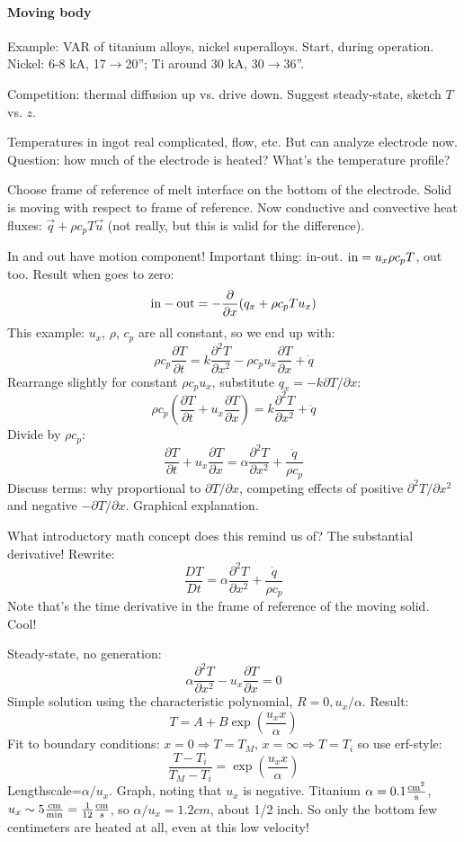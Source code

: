\documentclass{report}
\begin{document}
\paragraph{Moving body}
Example: VAR of titanium alloys, nickel superalloys.  Start, during operation.
Nickel: 6-8 kA, 17$\rightarrow$20''; Ti around 30 kA, 30$\rightarrow$36''.

Competition: thermal diffusion up vs. drive down.  Suggest steady-state, sketch
$T$ vs. $z$.

Temperatures in ingot real complicated, flow, etc.  But can analyze electrode
now.  Question: how much of the electrode is heated?  What's the temperature
profile?

Choose frame of reference of melt interface on the bottom of the electrode.
Solid is moving with respect to frame of reference.  Now conductive and
convective heat fluxes: $\vec{q} + \rho c_p T \vec{u}$ (not really, but this is
valid for the difference).

In and out have motion component!  Important thing: in-out.
${\rm in}=u_x \rho c_p T$, out too.  Result when goes to zero:
$${\rm in - out} = -\frac{\partial}{\partial x}(q_x + \rho c_p T u_x)$$
This example: $u_x$, $\rho$, $c_p$ are all constant, so we end up with:
$$\rho c_p \frac{\partial T}{\partial t} = k \frac{\partial^2 T}{\partial x^2}
- \rho c_p u_x \frac{\partial T}{\partial x} + \dot{q}$$
Rearrange slightly for constant $\rho c_p u_x$, substitute
$q_x = -k \partial T/\partial x$:
$$\rho c_p \left(\frac{\partial T}{\partial t} +
  u_x \frac{\partial T}{\partial x}\right) =
k \frac{\partial^2 T}{\partial x^2} + \dot{q}$$
Divide by $\rho c_p$:
$$\frac{\partial T}{\partial t} + u_x \frac{\partial T}{\partial x} =
\alpha\frac{\partial^2 T}{\partial x^2} + \frac{\dot{q}}{\rho c_p}$$
Discuss terms: why proportional to $\partial T/\partial x$, competing effects
of positive $\partial^2T/\partial x^2$ and negative $-\partial T/\partial x$.
Graphical explanation.

What introductory math concept does this remind us of?  The substantial
derivative!  Rewrite:
$$\frac{DT}{Dt} = \alpha\frac{\partial^2 T}{\partial x^2} +
\frac{\dot{q}}{\rho c_p}$$
Note that's the time derivative in the frame of reference of the moving solid.
Cool!

Steady-state, no generation:
$$\alpha\frac{\partial^2 T}{\partial x^2} - u_x \frac{\partial T}{\partial x} =
0$$
Simple solution using the characteristic
polynomial, $R=0, u_x/\alpha$.  Result:
$$T = A + B \exp\left(\frac{u_x x}{\alpha}\right)$$
Fit to boundary conditions: $x=0\Rightarrow T=T_M$, $x=\infty\Rightarrow T=T_i$
so use erf-style:
$$\frac{T-T_i}{T_M-T_i} = \exp\left(\frac{u_x x}{\alpha}\right)$$
Lengthscale=$\alpha/u_x$.  Graph, noting that $u_x$ is negative.  Titanium
$\rm\alpha=0.1\frac{cm^2}{s}$, $u_x\sim5\frac{\rm cm}{\rm min} =
\frac{1}{12}\frac{\rm cm}{s}$, so $\alpha/u_x = 1.2 cm$, about 1/2 inch.  So
only the bottom few centimeters are heated at all, even at this low velocity!
\end{document}
